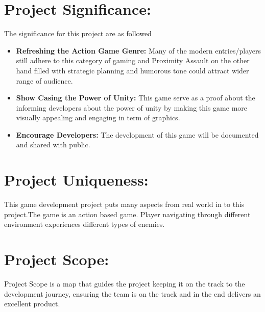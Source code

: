 \section{Project Significance:}
The significance for this project are as followed
\begin{itemize}
	\item \textbf{Refreshing the Action Game Genre:}
	Many of the modern entries/players still adhere to this category of gaming and Proximity Assault on the other hand filled with strategic planning and humorous tone could attract wider range of audience.
	\item \textbf{Show Casing the Power of Unity:}
	This game serve as a proof about the informing developers about the power of unity by making this game more visually appealing and engaging in term of graphics.
	\item \textbf{Encourage Developers:}
	The development of this game will be documented and shared with public.
\end{itemize}

\section{Project Uniqueness:}
This game development project puts many aspects from real world in to this project.The game is an action based game.
Player navigating through different environment experiences different types of enemies.
\section{Project Scope:}
Project Scope is a map that guides the project keeping it on the track to the development journey, ensuring the team is on the track and in the end delivers an excellent product.
